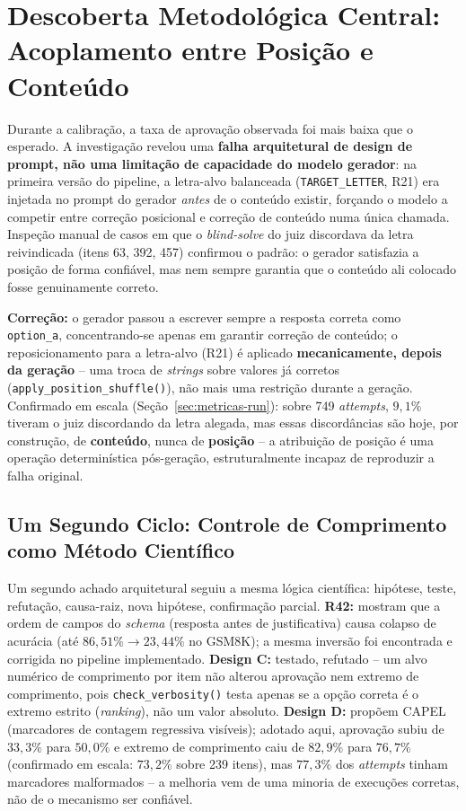 \documentclass[12pt]{article}
\begin{document}
\section{Descoberta Metodológica Central: Acoplamento entre Posição e
  Conteúdo}
\label{sec:descoberta}

Durante a calibração, a taxa de aprovação observada foi mais baixa que o
esperado. A investigação revelou uma \textbf{falha arquitetural de
  design de prompt, não uma limitação de capacidade do modelo gerador}:
na primeira versão do pipeline, a letra-alvo balanceada
(\texttt{TARGET\_LETTER}, R21) era injetada no prompt do gerador
\emph{antes} de o conteúdo existir, forçando o modelo a competir entre
correção posicional e correção de conteúdo numa única chamada. Inspeção
manual de casos em que o \emph{blind-solve} do juiz discordava da letra
reivindicada (itens 63, 392, 457) confirmou o padrão: o gerador
satisfazia a posição de forma confiável, mas nem sempre garantia que o
conteúdo ali colocado fosse genuinamente correto.

\textbf{Correção:} o gerador passou a escrever sempre a resposta correta
como \texttt{option\_a}, concentrando-se apenas em garantir correção de
conteúdo; o reposicionamento para a letra-alvo (R21) é aplicado
\textbf{mecanicamente, depois da geração} -- uma troca de \emph{strings}
sobre valores já corretos (\texttt{apply\_position\_shuffle()}), não
mais uma restrição durante a geração. Confirmado em escala
(Seção~\ref{sec:metricas-run}): sobre 749 \emph{attempts}, $9{,}1\%$
tiveram o juiz discordando da letra alegada, mas essas discordâncias
são hoje, por construção, de \textbf{conteúdo}, nunca de
\textbf{posição} -- a atribuição de posição é uma operação
determinística pós-geração, estruturalmente incapaz de reproduzir a
falha original.

\subsection{Um Segundo Ciclo: Controle de Comprimento como Método
  Científico}
\label{sec:segundo-ciclo}

Um segundo achado arquitetural seguiu a mesma lógica científica:
hipótese, teste, refutação, causa-raiz, nova hipótese, confirmação
parcial. \textbf{R42:} \cite{tam2024speak} mostram que a ordem de campos
do \emph{schema} (resposta antes de justificativa) causa colapso de
acurácia (até $86{,}51\%\to23{,}44\%$ no GSM8K); a mesma inversão foi
encontrada e corrigida no pipeline implementado. \textbf{Design
  C:} testado, refutado -- um alvo numérico de comprimento por item não
alterou aprovação nem extremo de comprimento, pois
\texttt{check\_verbosity()} testa apenas se a opção correta é o extremo
estrito (\emph{ranking}), não um valor absoluto. \textbf{Design D:}
\cite{xie2026length} propõem CAPEL (marcadores de contagem regressiva
visíveis); adotado aqui, aprovação subiu de $33{,}3\%$ para $50{,}0\%$
e extremo de comprimento caiu de $82{,}9\%$ para $76{,}7\%$ (confirmado
em escala: $73{,}2\%$ sobre 239 itens), mas $77{,}3\%$ dos
\emph{attempts} tinham marcadores malformados -- a melhoria vem de uma
minoria de execuções corretas, não de o mecanismo ser confiável.
\end{document}
